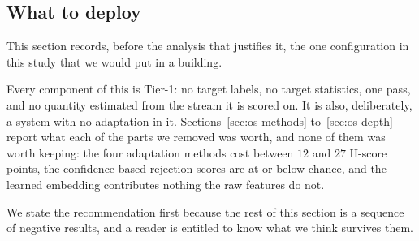 \subsection*{What to deploy}
\label{sec:os-deploy}

This section records, before the analysis that justifies it, the one configuration in this
study that we would put in a building.

\begin{center}\small
{}
\end{center}

Every component of this is Tier-1: no target labels, no target statistics, one pass, and no
quantity estimated from the stream it is scored on. It is also, deliberately, a system
with no adaptation in it. Sections~\ref{sec:os-methods} to~\ref{sec:os-depth} report what
each of the parts we removed was worth, and none of them was worth keeping: the four
adaptation methods cost between $12$ and $27$ H-score points, the confidence-based
rejection scores are at or below chance, and the learned embedding contributes nothing the
raw features do not.

We state the recommendation first because the rest of this section is a sequence of
negative results, and a reader is entitled to know what we think survives them.
